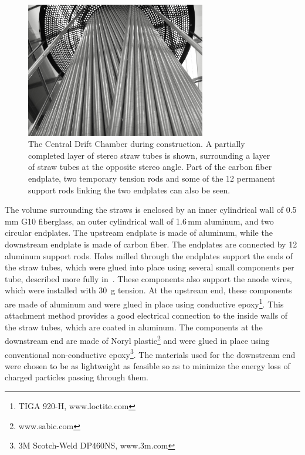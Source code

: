\begin{figure}[tbp]
\begin{center}
\includegraphics[width=0.7\textwidth]{figures/CDC_stereotubes.jpg}  
\caption{\label{fig:CDC_stereotubes}          
  The Central Drift Chamber during construction. A partially completed layer of stereo straw tubes is shown, surrounding a layer of straw tubes at the opposite stereo angle. Part of the carbon fiber endplate, two temporary tension rods and some of the 12 permanent support rods linking the two endplates can also be seen.}  
\end{center}
\end{figure}

The volume surrounding the straws is enclosed by an inner cylindrical wall of 0.5\,mm G10 fiberglass, an outer cylindrical wall of 1.6\,mm aluminum, and two circular endplates. 
The upstream endplate is made of aluminum, while the downstream endplate is made of carbon fiber. The endplates are connected by 12 aluminum support rods. 
Holes milled through the endplates support the ends of the straw tubes, which were glued into place using several small components per tube, described more fully in~\cite{GlueXCDCNIM}.  
These components also support the anode wires, which were installed with 30~g tension.
At the upstream end, these components are made of aluminum and were glued in place using conductive epoxy\footnote{TIGA 920-H, www.loctite.com}. 
This attachment method provides a good electrical connection to the inside walls of the straw tubes, which are coated in aluminum.
The components at the downstream end are made of Noryl plastic\footnote{www.sabic.com} and were glued in place using conventional non-conductive epoxy\footnote{3M Scotch-Weld DP460NS, www.3m.com}.
The materials used for the downstream end were chosen to be as lightweight as feasible so as to minimize the energy loss of charged particles passing through them. 

